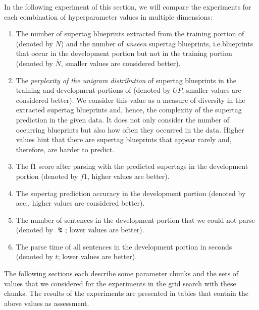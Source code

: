 \documentclass[../../document.tex]{subfiles}
\begin{document}
    In the following experiment of this section, we will compare the experiments for each combination of hyperparameter values in multiple dimensions:
    \begin{enumerate}
        \item The number of supertag blueprints extracted from the training portion of \negra{} (denoted by \(N\)) and the number of \emph{unseen} supertag blueprints, i.e.\@ blueprints that occur in the development portion but not in the training portion (denoted by \(\overline{N}\), smaller values are considered better).
        \item The \emph{perplexity of the unigram distribution} of supertag blueprints in the training and development portions of \negra{} (denoted by \(\mathit{UP}\), smaller values are considered better). We consider this value as a measure of diversity in the extracted supertag blueprints and, hence, the complexity of the supertag prediction in the given data. It does not only consider the number of occurring blueprints but also how often they occurred in the data. Higher values hint that there are supertag blueprints that appear rarely and, therefore, are harder to predict.
        \item The f1 score after parsing with the predicted supertags in the development portion (denoted by \(f1\), higher values are better).
        \item The supertag prediction accuracy in the development portion (denoted by acc., higher values are considered better).
        \item The number of sentences in the development portion that we could not parse (denoted by $\lightning$; lower values are better).
        \item The parse time of all sentences in the development portion in seconds (denoted by \(t\); lower values are better).
    \end{enumerate}
    
    The following sections each describe some parameter chunks and the sets of values that we considered for the experiments in the grid search with these chunks.
    The results of the experiments are presented in tables that contain the above values as assessment.
    
\end{document}
